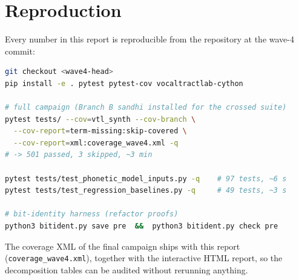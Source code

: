 \documentclass[11pt,a4paper]{article}
\newcommand{\code}[1]{\texttt{#1}}
\begin{document}
\section{Reproduction}
\label{sec:repro}

Every number in this report is reproducible from the repository at the
wave-4 commit:

\begin{lstlisting}[language=bash, caption={Reproducing the wave-4 measurement.}]
git checkout <wave4-head>
pip install -e . pytest pytest-cov vocaltractlab-cython

# full campaign (Branch B sandhi installed for the crossed suite)
pytest tests/ --cov=vtl_synth --cov-branch \
  --cov-report=term-missing:skip-covered \
  --cov-report=xml:coverage_wave4.xml -q
# -> 501 passed, 3 skipped, ~3 min

pytest tests/test_phonetic_model_inputs.py -q    # 97 tests, ~6 s
pytest tests/test_regression_baselines.py -q     # 49 tests, ~3 s

# bit-identity harness (refactor proofs)
python3 bitident.py save pre  &&  python3 bitident.py check pre
\end{lstlisting}

The coverage XML of the final campaign ships with this report
(\code{coverage\_wave4.xml}), together with the interactive HTML
report, so the decomposition tables can be audited without rerunning
anything.
\end{document}
